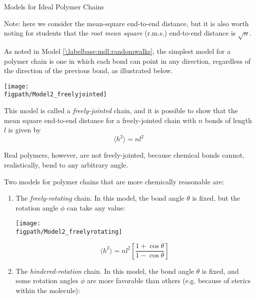 \begin{activity}{Models for Ideal Polymer Chains}
\begin{ctqs}
\begin{enumerate}
\begin{solution}[1.5in]
					Note: here we consider the mean-square end-to-end distance, but it is also worth noting for students that the \emph{root mean square} (r.m.s.) end-to-end distance is $\sqrt{n}$.
				
				\end{solution}
		\end{enumerate}
		

\end{ctqs}

\begin{model}
\label{\labelbase:mdl:chainmodels}

	As noted in Model \ref{\labelbase:mdl:randomwalks}, the simplest model for a polymer chain is one in which each bond can point in any direction, regardless of the direction of the previous bond, as illustrated below.
	
		\centerline{\texttt{[image: \\figpath/Model2\_freelyjointed]}}
	
	This model is called a \emph{freely-jointed} chain, and it is possible to show that the mean square end-to-end distance for a freely-jointed chain with $n$ bonds of length $l$ is given by
	\begin{equation*}
		\langle h^2\rangle =nl^2
	\end{equation*}
	
	Real polymers, however, are not freely-jointed, because chemical bonds cannot, realistically, bend to any arbitrary angle.
	
	Two models for polymer chains that are more chemically reasonable are:
	
	\begin{enumerate}
		\item The \emph{freely-rotating} chain.  In this model, the bond angle $\theta$ is fixed, but the rotation angle $\phi$ can take any value:
		
			\begin{minipage}[c]{0.45\textwidth}
				\centerline{\texttt{[image: \\figpath/Model2\_freelyrotating]}}
			\end{minipage}\begin{minipage}[c]{0.45\textwidth}
				\begin{equation*}
					\langle h^2\rangle = n l^2 \left[\frac{1+\cos\theta}{1-\cos\theta}\right]
				\end{equation*}
			\end{minipage}
		
		\item The \emph{hindered-rotation} chain.  In this model, the bond angle $\theta$ is fixed, and some rotation angles $\phi$ are more favorable than others (e.g. because of sterics within the molecule):
		

\end{enumerate}
\end{model}
\end{activity}
